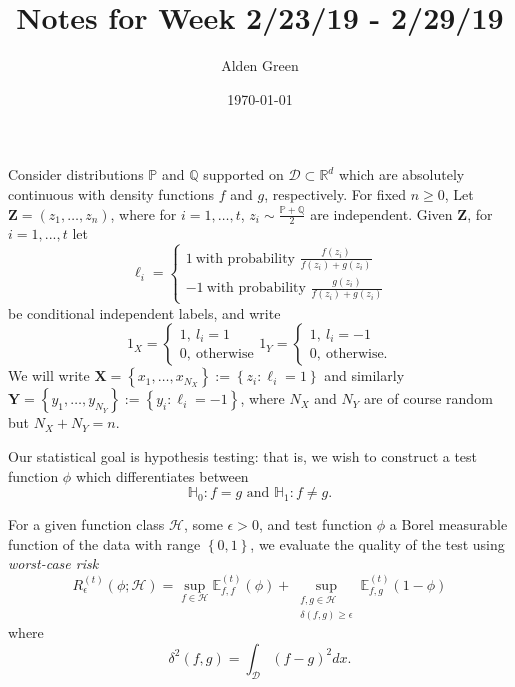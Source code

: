 \documentclass{article}
\newcommand{\Reals}{\mathbb{R}}
\newcommand{\set}[1]{\left\{#1\right\}}
\newcommand{\1}{\mathbb{I}}
\newcommand{\D}{\mathcal{D}}
\newcommand{\Xbf}{\mathbf{X}}
\newcommand{\Ybf}{\mathbf{Y}}
\newcommand{\Zbf}{\mathbf{Z}}
\newcommand{\Hclass}{\mathcal{H}}
\newcommand{\Pbb}{\mathbb{P}}
\newcommand{\Ebb}{\mathbb{E}}
\newcommand{\Qbb}{\mathbb{Q}}
\theoremstyle{alden}
\theoremstyle{aldenthm}
\theoremstyle{definition}
\theoremstyle{remark}
\begin{document}
\title{Notes for Week 2/23/19 - 2/29/19}
\author{Alden Green}
\date{\today}
\maketitle

Consider distributions $\Pbb$ and $\Qbb$ supported on $\D \subset \Reals^d$ which are absolutely continuous with density functions $f$ and $g$, respectively. For fixed $n \geq 0$, Let $\Zbf = (z_1, \ldots,z_n)$, where for $i = 1,\ldots,t$, $z_i \sim \frac{\Pbb + \Qbb}{2}$ are independent. Given $\Zbf$, for $i = 1,...,t$ let
\begin{equation*}
\ell_i = 
\begin{cases}
1~ \text{with probability $\frac{f(z_i)}{f(z_i) + g(z_i)}$} \\
-1~ \text{with probability $\frac{g(z_i)}{f(z_i) + g(z_i)}$}
\end{cases}
\end{equation*} 
be conditional independent labels, and write
\begin{equation*}
1_X = 
\begin{cases}
1,~ l_i = 1\\
0,~ \text{otherwise}
\end{cases}
1_Y = 
\begin{cases}
1,~ l_i = -1 \\
0,~ \text{otherwise.}
\end{cases}
\end{equation*}
We will write $\Xbf = \set{x_1, \ldots,x_{N_X}} := \set{z_i: \ell_i = 1}$ and similarly $\Ybf = \set{y_1, \ldots,y_{N_Y}} := \set{y_i: \ell_i = -1}$, where $N_X$ and $N_Y$ are of course random but $N_X + N_Y = n$. 

Our statistical goal is hypothesis testing: that is, we wish to construct a test function $\phi$ which differentiates between
\begin{equation*}
\mathbb{H}_0: f = g \text{ and } \mathbb{H}_1: f \neq g.
\end{equation*}

For a given function class $\Hclass$, some $\epsilon > 0$, and test function $\phi$ a Borel measurable function of the data with range $\set{0,1}$, we evaluate the quality of the test using \emph{worst-case risk}
\begin{equation*}
R_{\epsilon}^{(t)}(\phi; \Hclass) = \sup_{f \in \Hclass} \Ebb_{f,f}^{(t)}(\phi) + \sup_{ \substack{f,g \in \Hclass \\ \delta(f,g) \geq \epsilon } } \Ebb_{f,g}^{(t)}(1 - \phi)
\end{equation*} 
where 
\begin{equation*}
\delta^2(f,g) = \int_{\D} (f - g)^2 dx.
\end{equation*}
\end{document}

